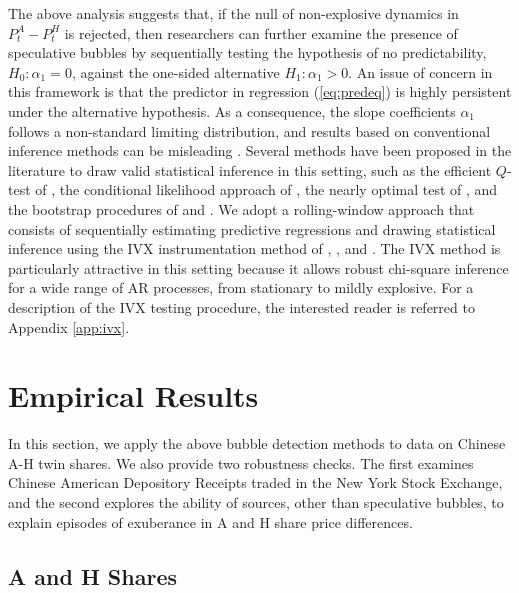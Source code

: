 \documentclass[11pt]{article}
\begin{document}
The above analysis suggests that, if the null of non-explosive dynamics in $P_t^A-P_t^H$ is rejected, then researchers can further examine the presence of speculative bubbles by sequentially testing the hypothesis of no predictability, $H_0:\alpha_1=0$, against the one-sided alternative $H_1:\alpha_1>0$. An issue of concern in this framework is that the predictor in regression (\ref{eq:predeq}) is highly persistent under the alternative hypothesis. As a consequence, the slope coefficients $\alpha_1$ follows a non-standard limiting distribution, and results based on conventional inference methods can be misleading \citep{Phillips2014}. Several methods have been proposed in the literature to draw valid statistical inference in this setting, such as the efficient $Q$-test of \citet{CampbellY2006}, the conditional likelihood approach of \citet{JanssonM2006}, the nearly optimal test of \citet{ElliotMS2015}, and the bootstrap procedures of \citet{kilian1999} and \citet{kilianT2003}. We adopt a rolling-window approach that consists of sequentially estimating predictive regressions and drawing statistical inference using the IVX instrumentation method of \citet{PhillipsM2009}, \citet{PhillipsL2013}, and \citet{KostakisMS2015}. The IVX method is particularly attractive in this setting because it allows robust chi-square inference for a wide range of AR processes, from stationary to mildly explosive. For a description of the IVX testing procedure, the interested reader is referred to Appendix \ref{app:ivx}. 

\section{Empirical Results}

In this section, we apply the above bubble detection methods to data on Chinese A-H twin shares. We also provide two robustness checks. The first examines Chinese American Depository Receipts traded in the New York Stock Exchange, and the second explores the ability of sources, other than speculative bubbles, to explain episodes of exuberance in A and H share price differences.    

\subsection{A and H Shares}
\end{document}

